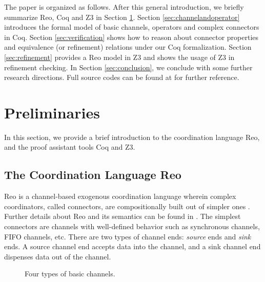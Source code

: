 \documentclass[preprint,3p]{elsarticle}
\begin{document}
The paper is organized as follows. After this general introduction, we briefly summarize Reo, Coq and Z3
in Section \ref{sec:pre}. Section \ref{sec:channelandoperator} introduces the
formal model of basic channels, operators and complex connectors in Coq. Section
\ref{sec:verification} shows how to reason about connector properties and equivalence (or
refinement) relations under our Coq formalization. Section \ref{sec:refinement} provides a Reo model in Z3 and shows the usage of Z3 in refinement checking.
In Section \ref{sec:conclusion}, we conclude with some further research directions. Full source codes can be found at \cite{reo2coq2Z3} for further reference.

\section{Preliminaries}\label{sec:pre}

In this section, we provide a brief introduction to the coordination language Reo, and the proof assistant tools Coq and Z3.

\subsection{The Coordination Language Reo}
Reo is a channel-based exogenous coordination language wherein complex coordinators, called connectors,
are compositionally built out of simpler ones \cite{Arb04}.
Further details about Reo and its semantics can be found in \cite{Arb04, AR03, BSAR06}.
The simplest connectors are channels with well-defined behavior such as synchronous channels, FIFO channels, etc.
There are two types of channel ends: \emph{source} ends and \emph{sink} ends. A source channel end accepts
data into the channel, and a sink channel end dispenses data out of the channel.
\begin{figure}
  \centering
  \vspace{-6mm}
  \caption{Four types of basic channels.}\label{fig:basicchannel}
\end{figure}
\end{document}

